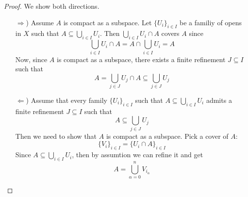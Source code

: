 \begin{center}
  \label{pic:fin_cover}
\end{center}

\begin{proof}
    We show both directions.
    \begin{enumerate}
      \item[\( \Rightarrow \))]
        Assume \( A \) is compact as
        a subspace.
        Let \( \{ U_i \} _{i \in I}\) be a familiy
        of opens in \( X \) such that
        \( A \subseteq \bigcup_{i \in I} U_i \).
        Then \( \bigcup_{i \in I} U_i \cap A \)
        covers \( A \) since
        \[
          \bigcup_{i \in I} U_i \cap A = A \cap \bigcup_{i \in I} U_i = A
        \]
        Now, since \( A \) is compact as a subspace,
        there exists a finite refinement \( J \subseteq I \)
        such that
        \[
          A = \bigcup_{j \in J} U_j \cap A
          \subseteq \bigcup_{j \in J} U_j
        \]
      \item[\( \Leftarrow \))]
        Assume that every family \( \{ U_i \} _{i \in I} \)
        such that \( A \subseteq \bigcup_{i \in I} U_i \)
        admits a finite refinement \( J \subseteq I \) such that
        \[
          A \subseteq \bigcup_{j \in J} U_j
        \]
        Then we need to show that \( A \) is compact as 
        a subspace.
        Pick a cover of \( A \):
        \[
          \{ V_i \}_{i \in I} = \{ U_i \cap A \}_{i \in I}
        \]
        Since \( A \subseteq \bigcup_{i \in I} U_i \),
        then by  assumtion we can refine it and get
        \[
          A = \bigcup_{\alpha = 0}^n V_{i_\alpha}
        \]
    \end{enumerate}
\end{proof}


